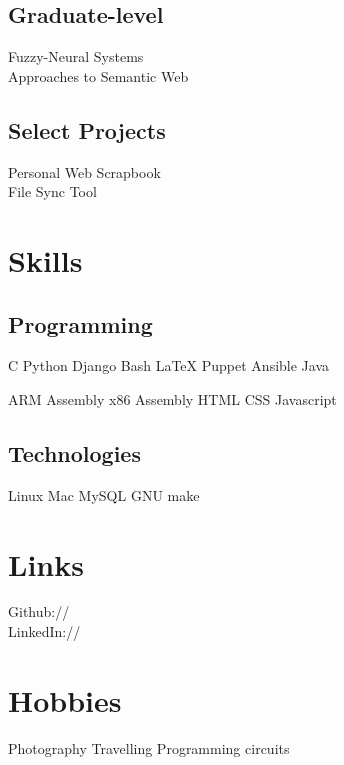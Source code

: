 \documentclass[]{deedy}
\begin{document}
\begin{minipage}[t]{0.33\textwidth}
\subsection{Graduate-level}
Fuzzy-Neural Systems \\
Approaches to Semantic Web \\
\sectionsep

\subsection{Select Projects}
Personal Web Scrapbook\\
File Sync Tool


\section{Skills}
\subsection{Programming}
C \textbullet{} Python \textbullet{} Django \textbullet{} Bash \textbullet{} \LaTeX \textbullet{} Puppet \textbullet{} Ansible \textbullet{} Java
\sectionsep

ARM Assembly \textbullet{} x86 Assembly \textbullet{} HTML \textbullet{} CSS \textbullet{} Javascript
\sectionsep

\subsection{Technologies}
Linux \textbullet{} Mac \textbullet{} MySQL \textbullet{} GNU make


\section{Links} 
Github:// \href{https://github.com/mitthu}{} \\
LinkedIn://  \href{https://www.linkedin.com/in/mitthu}{}


\section{Hobbies}
Photography \textbullet{} Travelling \textbullet{} Programming circuits

%
%

\end{minipage} 
\end{document}

